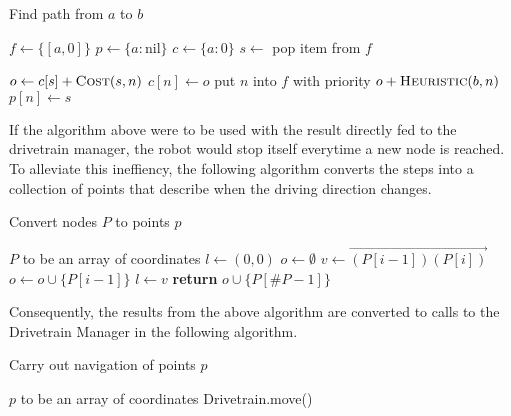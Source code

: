 \documentclass{article}
\begin{document}
\begin{algorithm}
    \caption{Find path from $a$ to $b$}
    \begin{algorithmic}[1]
            \State $f \gets \{[a, 0]\}$ 
            \State $p \gets \{a: \mathrm{nil}\}$ 
            \State $c \gets \{a: 0\}$ 
                \State $s \gets $ pop item from $f$ 

                    \State \Return {} 
                \EndIf

                 
                    \State $o \gets c[s]+\Call{Cost}{s,n}$ 
                     
                        \State $c[n] \gets o$
                        \State put $n$ into $f$ with priority $o+\Call{Heuristic}{b,n}$
                        \State $p[n] \gets s$
                    \EndIf
                \EndFor
            \EndWhile
        \EndProcedure
    \end{algorithmic}
\end{algorithm}

If the algorithm above were to be used with the result directly fed to the drivetrain manager, the robot would stop itself everytime a new node is reached. To alleviate this ineffiency, the following algorithm converts the steps into a collection of points that describe when the driving direction changes.

\begin{algorithm}
	\caption{Convert nodes $P$ to points $p$}
	\begin{algorithmic}[1]
		\Require $P$ to be an array of coordinates
			\State $l \gets (0,0)$ 
			\State $o \gets \emptyset$ 
			\For{$i$ \textbf{in} $[1,\#P)$} 
				\State $v \gets \overrightarrow{(P[i-1])(P[i])}$ 
					\State $o \gets o \cup \{P[i-1]\}$
					\State $l \gets v$
				\EndIf
			\EndFor
			\State \textbf{return} $o \cup \{P[\#P-1]\}$
		\EndProcedure
	\end{algorithmic}
\end{algorithm}

Consequently, the results from the above algorithm are converted to calls to the Drivetrain Manager in the following algorithm.

\begin{algorithm}
	\caption{Carry out navigation of points $p$}
	\begin{algorithmic}[1]
		\Require $p$ to be an array of coordinates
			\For{$i$ \textbf{in} $[1,\#p)$} 
				\State Drivetrain.move()
			\EndFor
		\EndProcedure
	\end{algorithmic}
\end{algorithm}
			
\end{document}
